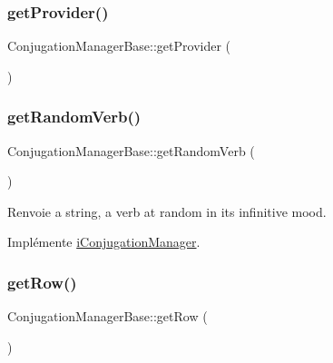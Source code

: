 \hypertarget{class_conjugation_manager_base_a1d66b72e31e4eff2263a15837e7a7c7d}{}\label{class_conjugation_manager_base_a1d66b72e31e4eff2263a15837e7a7c7d} 
\subsubsection{\texorpdfstring{get\+Provider()}{getProvider()}}
{\footnotesize\ttfamily Conjugation\+Manager\+Base\+::get\+Provider (\begin{DoxyParamCaption}{ }\end{DoxyParamCaption})}

\hypertarget{class_conjugation_manager_base_ac2e82ace9b19d7b014908ec275b552bc}{}\label{class_conjugation_manager_base_ac2e82ace9b19d7b014908ec275b552bc} 
\subsubsection{\texorpdfstring{get\+Random\+Verb()}{getRandomVerb()}}
{\footnotesize\ttfamily Conjugation\+Manager\+Base\+::get\+Random\+Verb (\begin{DoxyParamCaption}{ }\end{DoxyParamCaption})}

\begin{DoxyReturn}{Renvoie}
a string, a verb at random in its infinitive mood. 
\end{DoxyReturn}


Implémente \hyperlink{interfacei_conjugation_manager_a2e955e8c88d45869683005343cbfac60}{i\+Conjugation\+Manager}.

\hypertarget{class_conjugation_manager_base_a6ac46ba320536e11f2f0eedb2e04fced}{}\label{class_conjugation_manager_base_a6ac46ba320536e11f2f0eedb2e04fced} 
\subsubsection{\texorpdfstring{get\+Row()}{getRow()}}
{\footnotesize\ttfamily Conjugation\+Manager\+Base\+::get\+Row (\begin{DoxyParamCaption}{ }\end{DoxyParamCaption})}

